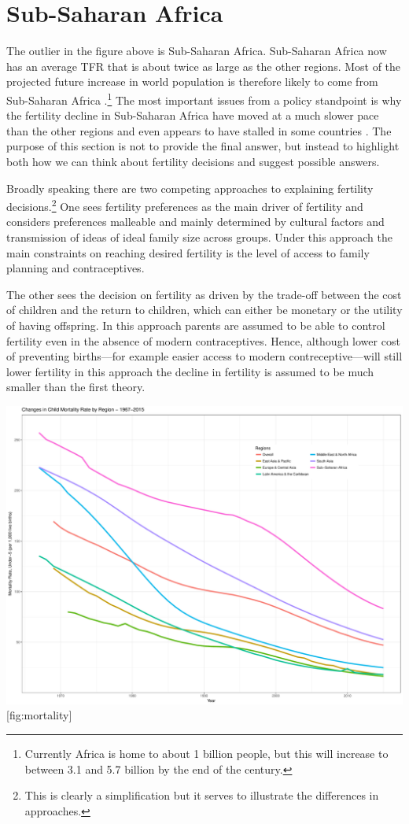 \documentclass[]{article}
\begin{document}
\section{Sub-Saharan Africa}\label{sub-saharan-africa}

The outlier in the figure above is Sub-Saharan Africa. Sub-Saharan Africa now has an average TFR that is about twice as large as the other regions. Most of the projected future increase in world population is therefore likely to come from Sub-Saharan Africa \citep{Gerland2014}.\footnote{Currently Africa is home to about 1 billion people, but this will increase to between 3.1 and 5.7 billion by the end of the century.} The most important issues from a policy standpoint is why the fertility decline in Sub-Saharan Africa have moved at a much slower pace than the other regions and even appears to have stalled in some countries \citep{Ainsworth1996a,Singh2017}. The purpose of this section is not to provide the final answer, but instead to highlight both how we can think about fertility decisions and suggest possible answers.

Broadly speaking there are two competing approaches to explaining fertility decisions.\footnote{This is clearly a simplification but it serves to illustrate the differences in approaches.} One sees fertility preferences as the main driver of fertility and considers preferences malleable and mainly determined by cultural factors and transmission of ideas of ideal family size across groups. Under this approach the main constraints on reaching desired fertility is the level of access to family planning and contraceptives.

The other sees the decision on fertility as driven by the trade-off between the cost of children and the return to children, which can either be monetary or the utility of having offspring. In this approach parents are assumed to be able to control fertility even in the absence of modern contraceptives. Hence, although lower cost of preventing births---for example easier access to modern contreceptive---will still lower fertility in this approach the decline in fertility is assumed to be much smaller than the first theory.

\includegraphics{../figures/childMortalityRates.pdf} {[}fig:mortality{]}
\end{document}
